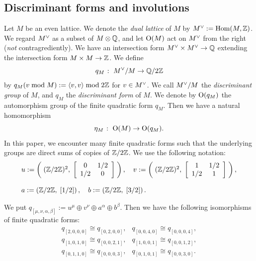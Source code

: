 \documentclass{amsart} %
\begin{document}
\subsection{Discriminant forms and involutions}\label{subsec:discfinvol}
%
\newcommand{\dLat}{M}
\newcommand{\dLatplus}{M_+}
\newcommand{\dLatminus}{M_-}
%
Let $\dLat$ be an even lattice.
We denote the \emph{dual lattice} of $\dLat$ by $\dLat\dual:=\Hom(\dLat, \ZZ)$.
We regard $\dLat\dual$ as a subset of $\dLat\tensor \QQ$,
and let $\OG(\dLat)$ act on $\dLat\dual$ from the right
(\emph{not} contragrediently).
We have 
an intersection form $\dLat\dual \times \dLat\dual \to \QQ$
extending the intersection form $\dLat \times \dLat \to \ZZ$.
We define 
\[
q_\dLat\;\colon\; \dLat\dual/\dLat \to \QQ/2\ZZ
\]
by $q_\dLat(v \bmod \dLat):=\intf{v, v} \bmod 2\ZZ$ for $v\in \dLat\dual$.
We call $\dLat\dual/\dLat$ the \emph{discriminant group} of $\dLat$,
and $q_\dLat$ the \emph{discriminant form} of $\dLat$.
We denote by $\OG(q_\dLat)$ the automorphism group of 
the finite quadratic form $q_\dLat$.
Then we have a natural homomorphism
\[
\eta_\dLat\;\colon\; \OG(\dLat) \to \OG(q_\dLat).
\]
%
In this paper,
we encounter many finite quadratic forms 
such that the underlying groups are 
direct sums of copies of $\mathord{\mathbb{Z}}/2\mathord{\mathbb{Z}}$. 
 We use the following notation:
%
\begin{equation}\label{eq:uvab}
\begin{array}{l}
u:=\left(\;(\mathord{\mathbb{Z}}/2\mathord{\mathbb{Z}})^2, \;\left[\begin{array}{cc}0&1/2 \\1/2 &0\end{array}\right]\;\right),\quad 
v:=\left(\;(\mathord{\mathbb{Z}}/2\mathord{\mathbb{Z}})^2, \;\left[\begin{array}{cc}1&1/2 \\1/2 &1\end{array}\right]\;\right),\\
\\
a:=\left(\mathord{\mathbb{Z}}/2\mathord{\mathbb{Z}}, \;\left[1/2\right]\right),\quad
b:=\left(\mathord{\mathbb{Z}}/2\mathord{\mathbb{Z}}, \;\left[3/2\right]\right).
\end{array}
\end{equation}
%
%
%
\begin{remark}\label{rem:isomqs}
We put $q_{[\mu,\nu, \alpha, \beta]}:=u^{\mu}\oplus v^{\nu} \oplus a^{\alpha}\oplus b^{\beta}$. 
Then we have the following isomorphisms of finite quadratic forms:
\[
\renewcommand{\arraystretch}{1.1}
\begin{array}{ll}
q_{[ 2, 0, 0, 0]}\cong q_{[ 0, 2, 0, 0]}, &
q_{[ 0, 0, 4, 0]}\cong q_{[ 0, 0, 0, 4]}, \\
q_{[ 1, 0, 1, 0]}\cong q_{[ 0, 0, 2, 1 ]}, &
q_{[ 1, 0, 0, 1]}\cong q_{[ 0, 0, 1, 2 ]},\\
q_{[ 0, 1, 1, 0 ]}\cong q_{[ 0, 0, 0, 3 ]}, &
q_{[ 0, 1, 0, 1 ]}\cong q_{[ 0, 0, 3, 0]}.
\end{array}
\]
\end{remark}
\end{document}
